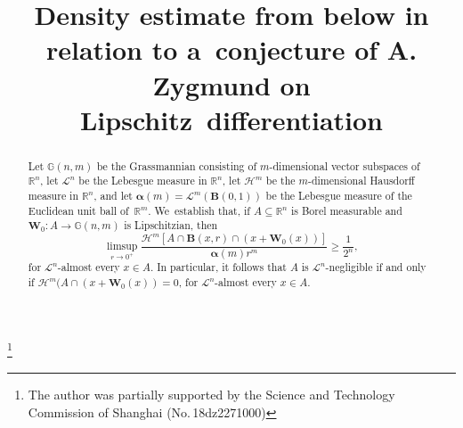 \documentclass[JEP,XML,SOM,Unicode,ThmDefs,NoEqCountersInSection]{cedram}
\let\subset\subseteq
\begin{document}
\frontmatter
\title[On a conjecture of A. Zygmund]{Density estimate from below
in relation to a~conjecture of A. Zygmund
on Lipschitz~differentiation}

\author[\initial{Th.} \lastname{De Pauw}]{ }
\address{Université Paris Cité and Sorbonne Université, CNRS, IMJ-PRG\\ F-75013 Paris, France}

\thanks{The author was partially supported by the Science and Technology Commission of Shanghai (No.\,18dz2271000)}

\begin{abstract}
Let $\mathbb{G}(n,m)$ be the Grassmannian consisting of $m$-dimensional vector subspaces of~$\mathbb{R}^n$, let $\mathscr{L}^n$ be the Lebesgue measure in $\mathbb{R}^n$, let $\mathscr{H}^m$ be the $m$-dimensional Hausdorff measure in $\mathbb{R}^n$, and let $\boldsymbol{\alpha}(m) = \mathscr{L}^m(\boldsymbol{B}(0,1))$ be the Lebesgue measure of the Euclidean unit ball of~$\mathbb{R}^m$. We~establish that, if $A \subset \mathbb{R}^n$ is Borel measurable and $\boldsymbol{W}_0: A \to \mathbb{G}(n,m)$ is Lipschitzian, then
\begin{equation*}
\limsup_{r \to 0^+} \frac{\mathscr{H}^m \left[ A \cap \boldsymbol{B}(x,r) \cap (x+\boldsymbol{W}_0(x))\right]}{\boldsymbol{\alpha}(m)r^m} \geq \frac{1}{2^n},
\end{equation*}
for $\mathscr{L}^n$-almost every $x \in A$. In particular, it follows that
$A$ is $\mathscr{L}^n$-negligible if and only if $\mathscr{H}^m(A \cap (x+\boldsymbol{W}_0(x))=0$, for $\mathscr{L}^n$-almost every $x \in A$.
\end{abstract}




\end{document}
